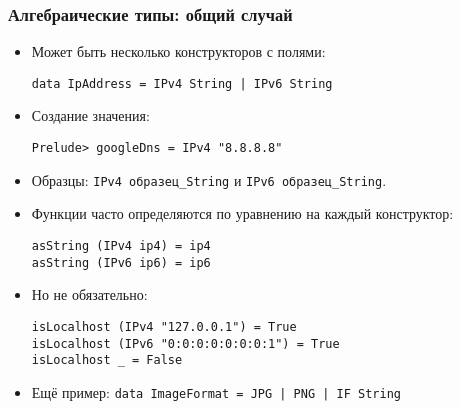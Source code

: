 \documentclass[10pt]{beamer}
\begin{document}
\begin{frame}[fragile]
\frametitle{Алгебраические типы: общий случай}
\begin{itemize}
    \item Может быть несколько конструкторов с полями:
\begin{lstlisting}[basicstyle=\ttfamily\small]
data IpAddress = IPv4 String | IPv6 String
\end{lstlisting}
\item Создание значения:
\begin{lstlisting}[basicstyle=\ttfamily\small]
Prelude> googleDns = IPv4 "8.8.8.8"
\end{lstlisting}
\item Образцы: \lstinline[basicstyle=\ttfamily\small]|IPv4 образец_String| и \lstinline[basicstyle=\ttfamily\small]|IPv6 образец_String|.
\item Функции часто определяются по уравнению на каждый конструктор:
\begin{lstlisting}[basicstyle=\ttfamily\small]
asString (IPv4 ip4) = ip4
asString (IPv6 ip6) = ip6
\end{lstlisting}
\pause
\item Но не обязательно:
\begin{lstlisting}[basicstyle=\ttfamily\small]
isLocalhost (IPv4 "127.0.0.1") = True
isLocalhost (IPv6 "0:0:0:0:0:0:0:1") = True
isLocalhost _ = False
\end{lstlisting}
\pause
\item Ещё пример: \lstinline[basicstyle=\ttfamily\small]!data ImageFormat = JPG | PNG | IF String!
\end{itemize}
\end{frame}
\end{document}
